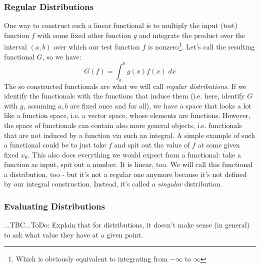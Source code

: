 \subsubsection{Regular Distributions}
One way to construct such a linear functional is to multiply the input (test) function $f$ with some fixed other function $g$ and integrate the product over the interval $(a,b)$ over which our test function $f$ is nonzero\footnote{Which is obviously equivalent to integrating from $-\infty$ to $\infty$}. Let's call the resulting functional $G$, so we have:
\begin{equation}
 G(f) = \int_a^b g(x) f(x) \; dx
\end{equation}
The so constructed functionals are what we will call \emph{regular distributions}. If we identify the functionals with the functions that induce them (i.e. here, identify $G$ with $g$, assuming $a,b$ are fixed once and for all), we have a space that looks a lot like a function space, i.e. a vector space, whose elements are functions. However, the space of functionals can contain also more general objects, i.e. functionals that are not induced by a function via such an integral. A simple example of such a functional could be to just take $f$ and spit out the value of $f$ at some given fixed $x_0$. This also does everything we would expect from a functional: take a function as input, spit out a number. It is linear, too. We will call this functional a distribution, too - but it's not a regular one anymore because it's not defined by our integral construction. Instead, it's called a \emph{singular} distribution.



\subsubsection{Evaluating Distributions} ...TBC...ToDo: Explain that for distributions, it doesn't make sense (in general) to ask what value they have at a given point. 


